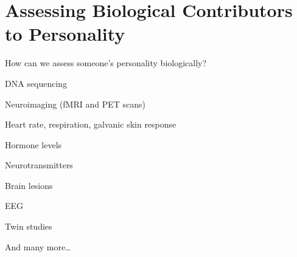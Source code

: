 \section{Assessing Biological Contributors to Personality}

\begin{coloredlist}
    \item How can we assess someone's personality biologically?
    \begin{coloredlist}
        \item DNA sequencing
        \item Neuroimaging (fMRI and PET scans)
        \item Heart rate, respiration, galvanic skin response
        \item Hormone levels
        \item Neurotransmitters
        \item Brain lesions
        \item EEG
        \item Twin studies
        \item And many more\ldots
    \end{coloredlist}
\end{coloredlist}